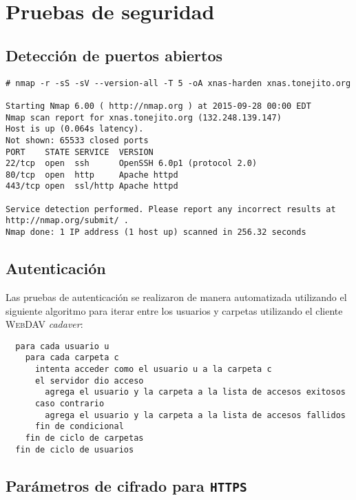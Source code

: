     \section {Pruebas de seguridad}

      \subsection {Detecci\'{o}n de puertos abiertos}

{
\scriptsize
\linespread{1}
\begin{verbatim}
# nmap -r -sS -sV --version-all -T 5 -oA xnas-harden xnas.tonejito.org

Starting Nmap 6.00 ( http://nmap.org ) at 2015-09-28 00:00 EDT
Nmap scan report for xnas.tonejito.org (132.248.139.147)
Host is up (0.064s latency).
Not shown: 65533 closed ports
PORT    STATE SERVICE  VERSION
22/tcp  open  ssh      OpenSSH 6.0p1 (protocol 2.0)
80/tcp  open  http     Apache httpd
443/tcp open  ssl/http Apache httpd

Service detection performed. Please report any incorrect results at http://nmap.org/submit/ .
Nmap done: 1 IP address (1 host up) scanned in 256.32 seconds
\end{verbatim}
}


      \subsection {Autenticaci\'{o}n}

Las pruebas de autenticaci\'{o}n se realizaron de manera automatizada utilizando el siguiente algoritmo para iterar entre los usuarios y carpetas utilizando el cliente \textsc{WebDAV} \textsl{cadaver}:

{
\scriptsize
\linespread{1}
\begin{verbatim}
  para cada usuario u
    para cada carpeta c
      intenta acceder como el usuario u a la carpeta c
      el servidor dio acceso
        agrega el usuario y la carpeta a la lista de accesos exitosos
      caso contrario
        agrega el usuario y la carpeta a la lista de accesos fallidos
      fin de condicional
    fin de ciclo de carpetas
  fin de ciclo de usuarios
\end{verbatim}
}

      \subsection {Par\'{a}metros de cifrado para \texttt{HTTPS}}

